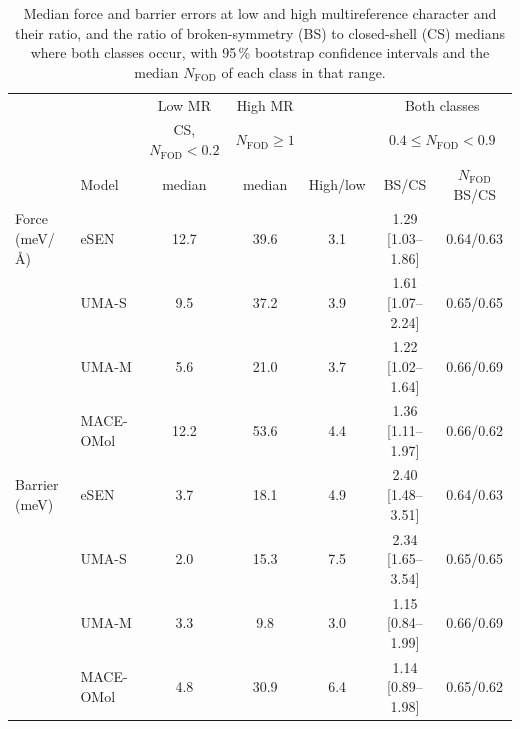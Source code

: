 \begin{table}
  \caption{Median force and barrier errors at low and high multireference character and their ratio, and the ratio of broken-symmetry (BS) to closed-shell (CS) medians where both classes occur, with 95\,\% bootstrap confidence intervals and the median $N_\mathrm{FOD}$ of each class in that range.}
  \label{tbl:ratios}
  \begin{tabular}{llccccc}
    \hline
    & & Low MR & High MR & & \multicolumn{2}{c}{Both classes} \\
    & & CS, $N_\mathrm{FOD} < 0.2$ & $N_\mathrm{FOD} \geq 1$ & & \multicolumn{2}{c}{$0.4 \leq N_\mathrm{FOD} < 0.9$} \\
    & Model & median & median & High/low & BS/CS & $N_\mathrm{FOD}$ BS/CS \\
    \hline
    Force (meV/\AA{}) & eSEN      & 12.7 & 39.6 & 3.1 & 1.29 [1.03--1.86] & 0.64/0.63 \\
                      & UMA-S     &  9.5 & 37.2 & 3.9 & 1.61 [1.07--2.24] & 0.65/0.65 \\
                      & UMA-M     &  5.6 & 21.0 & 3.7 & 1.22 [1.02--1.64] & 0.66/0.69 \\
                      & MACE-OMol & 12.2 & 53.6 & 4.4 & 1.36 [1.11--1.97] & 0.66/0.62 \\
    \hline
    Barrier (meV)     & eSEN      &  3.7 & 18.1 & 4.9 & 2.40 [1.48--3.51] & 0.64/0.63 \\
                      & UMA-S     &  2.0 & 15.3 & 7.5 & 2.34 [1.65--3.54] & 0.65/0.65 \\
                      & UMA-M     &  3.3 &  9.8 & 3.0 & 1.15 [0.84--1.99] & 0.66/0.69 \\
                      & MACE-OMol &  4.8 & 30.9 & 6.4 & 1.14 [0.89--1.98] & 0.65/0.62 \\
    \hline
  \end{tabular}
\end{table}


